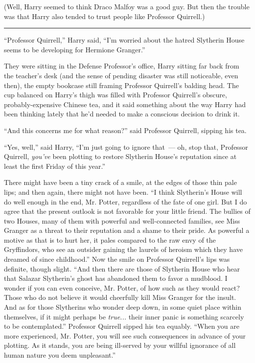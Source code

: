 (Well, Harry seemed to think Draco Malfoy was a good guy. But then the trouble was that Harry also tended to trust people like Professor Quirrell.)

\begin{center}\rule{3in}{0.4pt}\end{center}

``Professor Quirrell,'' Harry said, ``I'm worried about the hatred Slytherin House seems to be developing for Hermione Granger.''

They were sitting in the Defense Professor's office, Harry sitting far back from the teacher's desk (and the sense of pending disaster was still noticeable, even then), the empty bookcase still framing Professor Quirrell's balding head. The cup balanced on Harry's thigh was filled with Professor Quirrell's obscure, probably-expensive Chinese tea, and it said something about the way Harry had been thinking lately that he'd needed to make a conscious decision to drink it.

``And this concerns me for what reason?'' said Professor Quirrell, sipping his tea.

``Yes, well,'' said Harry, ``I'm just going to ignore that~--- oh, stop that, Professor Quirrell, \emph{you've} been plotting to restore Slytherin House's reputation since at least the first Friday of this year.''

There might have been a tiny crack of a smile, at the edges of those thin pale lips; and then again, there might not have been. ``I think Slytherin's House will do well enough in the end, Mr. Potter, regardless of the fate of one girl. But I do agree that the present outlook is not favorable for your little friend. The bullies of two Houses, many of them with powerful and well-connected families, see Miss Granger as a threat to their reputation and a shame to their pride. As powerful a motive as that is to hurt her, it pales compared to the raw envy of the Gryffindors, who see an outsider gaining the laurels of heroism which they have dreamed of since childhood.'' Now the smile on Professor Quirrell's lips was definite, though slight. ``And then there are those of Slytherin House who hear that Salazar Slytherin's ghost has abandoned them to favor a mudblood. I wonder if you can even conceive, Mr. Potter, of how such as they would react? Those who do not believe it would cheerfully kill Miss Granger for the insult. And as for those Slytherins who wonder deep down, in some quiet place within themselves, if it might perhaps be \emph{true...} their inner panic is something scarcely to be contemplated.'' Professor Quirrell sipped his tea equably. ``When you are more experienced, Mr. Potter, you will see such consequences in advance of your plotting. As it stands, you are being ill-served by your willful ignorance of all human nature you deem unpleasant.''

